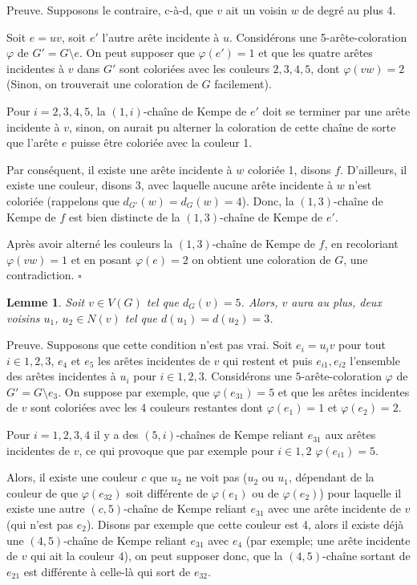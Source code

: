 \documentclass[10pt,a4paper]{article}
\newtheorem{lemme}{Lemme}
\newcommand{\ep}{{\hfill $\square$}}
\begin{document}
Preuve. 
Supposons le contraire, c-à-d, que $v$ ait un voisin $w$ de degré au plus 4.

Soit $e=uv$, soit $e'$ l'autre arête incidente à $u$.
Considérons une 5-arête-coloration $\varphi$ de $G'=G \setminus e$. On peut supposer que $\varphi(e')=1$ et que les quatre arêtes incidentes à $v$ dans $G'$ sont coloriées avec les couleurs $2,3,4,5$, dont $\varphi(vw)=2$ (Sinon, on trouverait une coloration de $G$ facilement).

Pour $i=2,3,4,5$, la $(1,i)$-chaîne de Kempe de $e'$ doit se terminer par une arête incidente à $v$, sinon, on aurait pu alterner la coloration de cette chaîne de sorte que l'arête $e$ puisse être coloriée avec la couleur 1. 

Par conséquent, il existe une arête incidente à $w$ coloriée 1, disons $f$. D'ailleurs, il existe une couleur, disons 3, avec laquelle aucune arête incidente à $w$ n'est coloriée (rappelons que $d_{G'}(w)=d_G(w)=4$). Donc, la $(1,3)$-chaîne de Kempe de $f$ est bien distincte de la $(1,3)$-chaîne de Kempe de $e'$.

Après avoir alterné les couleurs la $(1,3)$-chaîne de Kempe de $f$, en recoloriant $\varphi(vw)=1$ et en posant $\varphi(e)=2$ on obtient une coloration de $G$, une contradiction. \ep

\begin{lemme}
Soit $v \in V(G)$ tel que $d_G(v) = 5$. Alors, $v$ aura au plus, deux voisins $u_1$, $u_2 \in N(v)$ tel que $d(u_1) = d(u_2) = 3$.
\label{le:5333}
\end{lemme}


Preuve.
Supposons que cette condition n'est pas vrai. Soit $e_i = u_iv$ pour tout $i \in {1,2,3}$, $e_4$ et $e_5$ les arêtes incidentes de $v$ qui restent et puis ${e_{i1}, e_{i2}}$ l'ensemble des arêtes incidentes à $u_i$ pour $i \in {1,2,3}$. Considérons une $5$-arête-coloration $\varphi$ de $G' = G \setminus e_3$. On suppose par exemple, que $\varphi(e_{31}) = 5$ et que les arêtes incidentes de $v$ sont coloriées avec les 4 couleurs restantes dont $\varphi(e_1)=1$ et $\varphi(e_2)=2$.

Pour $i = 1,2,3,4$ il y a des $(5,i)$-chaînes de Kempe reliant $e_{31}$ aux arêtes incidentes de $v$, ce qui provoque que par exemple pour $i \in {1,2}$ $\varphi(e_{i1}) = 5$.

Alors, il existe une couleur $c$ que $u_2$ ne voit pas ($u_2$ ou $u_1$, dépendant de la couleur de  que $\varphi(e_{32})$ soit différente de $\varphi(e_1)$ ou de $\varphi(e_2)$)  pour laquelle il existe une autre $(c,5)$-chaîne de Kempe reliant $e_{31}$ avec une arête incidente de $v$ (qui n'est pas $e_2$). Disons par exemple que cette couleur est 4, alors il existe déjà une $(4,5)$-chaîne de Kempe reliant $e_{31}$ avec $e_4$ (par exemple; une arête incidente de $v$ qui ait la couleur $4$), on peut supposer donc, que la $(4,5)$-chaîne sortant de $e_{21}$ est différente à celle-là qui sort de $e_{32}$.
\end{document}
